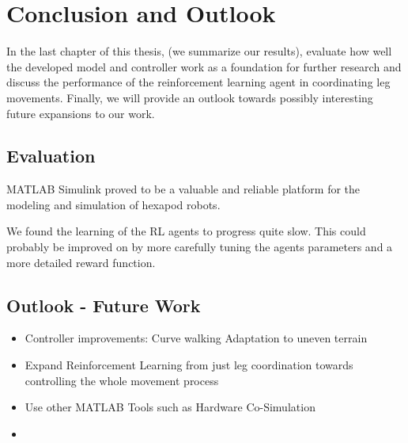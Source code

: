 \chapter{Conclusion and Outlook}
\label{ch:conclusion}

In the last chapter of this thesis, (we summarize our results), evaluate how well the developed model and controller work as a foundation for further research and discuss the performance of the reinforcement learning agent in coordinating leg movements.
Finally, we will provide an outlook towards possibly interesting future expansions to our work.


\section{Evaluation}

MATLAB Simulink proved to be a valuable and reliable platform for the modeling and simulation of hexapod robots.





We found the learning of the RL agents to progress quite slow. 
This could probably be improved on by more carefully tuning the agents parameters and a more detailed reward function.



\section{Outlook - Future Work}



\begin{itemize}
	
	\item Controller improvements:
		\subitem Curve walking
		\subitem Adaptation to uneven terrain
		\subitem 
	
	\item Expand Reinforcement Learning from just leg coordination towards controlling the whole movement process
	
	\item Use other MATLAB Tools such as Hardware Co-Simulation
	
	\item 
	
\end{itemize}